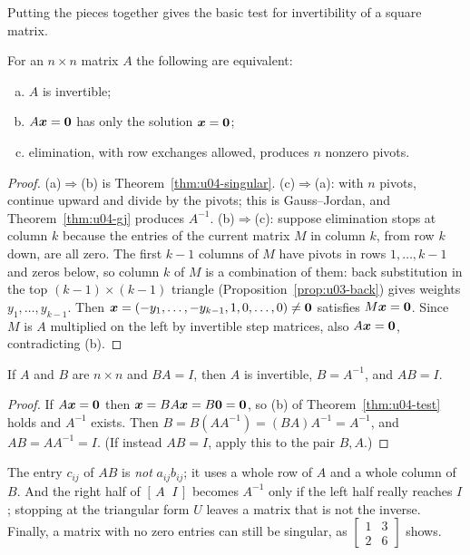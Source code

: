 Putting the pieces together gives the basic test for invertibility of a square matrix.

\begin{theorem}\label{thm:u04-test}
For an $n\times n$ matrix $A$ the following are equivalent:
\begin{enumerate}[(a)]
  \item $A$ is invertible;
  \item $A\boldsymbol{x}=\boldsymbol{0}$ has only the solution $\boldsymbol{x}=\boldsymbol{0}$;
  \item elimination, with row exchanges allowed, produces $n$ nonzero pivots.
\end{enumerate}
\end{theorem}

\begin{proof}
(a)$\Rightarrow$(b) is Theorem~\ref{thm:u04-singular}. (c)$\Rightarrow$(a): with $n$ pivots,
continue upward and divide by the pivots; this is Gauss--Jordan, and
Theorem~\ref{thm:u04-gj} produces $A^{-1}$. (b)$\Rightarrow$(c): suppose elimination stops at
column $k$ because the entries of the current matrix $M$ in column $k$, from row $k$ down, are
all zero. The first $k-1$ columns of $M$ have pivots in rows $1,\dots,k-1$ and zeros below,
so column $k$ of $M$ is a combination of them: back substitution in the top
$(k-1)\times(k-1)$ triangle (Proposition~\ref{prop:u03-back}) gives weights
$y_1,\dots,y_{k-1}$. Then $\boldsymbol{x}=(-y_1,\dots,-y_{k-1},1,0,\dots,0)\neq\boldsymbol{0}$ satisfies
$M\boldsymbol{x}=\boldsymbol{0}$. Since $M$ is $A$ multiplied on the left by invertible step matrices, also
$A\boldsymbol{x}=\boldsymbol{0}$, contradicting (b).
\end{proof}

\begin{corollary}\label{cor:u04-onesided}
If $A$ and $B$ are $n\times n$ and $BA=I$, then $A$ is invertible, $B=A^{-1}$, and $AB=I$.
\end{corollary}

\begin{proof}
If $A\boldsymbol{x}=\boldsymbol{0}$ then $\boldsymbol{x}=BA\boldsymbol{x}=B\boldsymbol{0}=\boldsymbol{0}$, so (b) of
Theorem~\ref{thm:u04-test} holds and $A^{-1}$ exists. Then
$B=B(AA^{-1})=(BA)A^{-1}=A^{-1}$, and $AB=AA^{-1}=I$. (If instead $AB=I$, apply this to the
pair $B,A$.)
\end{proof}

\begin{trap}
The entry $c_{ij}$ of $AB$ is \emph{not} $a_{ij}b_{ij}$; it uses a whole row of $A$ and a whole
column of $B$. And the right half of $[\,A\;\;I\,]$ becomes $A^{-1}$ only if the left half
really reaches $I$; stopping at the triangular form $U$ leaves a matrix that is not the
inverse. Finally, a matrix with no zero entries can still be singular, as
$\begin{bmatrix} 1&3\\ 2&6\end{bmatrix}$ shows.
\end{trap}


